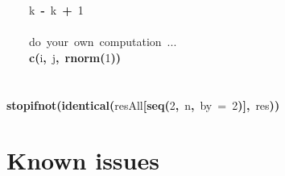 \documentclass[a4paper,12pt]{article}\usepackage{graphicx, color}
\makeatletter
\newcommand{\hlnumber}[1]{\textcolor[rgb]{0,0,0}{#1}}%
\newcommand{\hlfunctioncall}[1]{\textcolor[rgb]{0.501960784313725,0,0.329411764705882}{\textbf{#1}}}%
\newcommand{\hlkeyword}[1]{\textcolor[rgb]{0,0,0}{\textbf{#1}}}%
\newcommand{\hlargument}[1]{\textcolor[rgb]{0.690196078431373,0.250980392156863,0.0196078431372549}{#1}}%
\newcommand{\hlcomment}[1]{\textcolor[rgb]{0.180392156862745,0.6,0.341176470588235}{#1}}%
\newcommand{\hlassignement}[1]{\textcolor[rgb]{0,0,0}{\textbf{#1}}}%
\newcommand{\hlsymbol}[1]{\textcolor[rgb]{0,0,0}{#1}}%
\newcommand{\hlstd}[1]{\textcolor[rgb]{0,0,0}{#1}}%
\newenvironment{kframe}{%
 \def\FrameCommand##1{\hskip\@totalleftmargin \hskip-\fboxsep
 \colorbox{shadecolor}{##1}\hskip-\fboxsep
     \hskip-\linewidth \hskip-\@totalleftmargin \hskip\columnwidth}%
 \MakeFramed {\advance\hsize-\width
   \@totalleftmargin\z@ \linewidth\hsize
   \@setminipage}}%
 {\par\unskip\endMakeFramed}
\newenvironment{knitrout}{}{} %
\renewenvironment{knitrout}{\begin{footnotesize}}{\end{footnotesize}}
\makeatother
\begin{document}
\begin{knitrout}
\begin{kframe}
\begin{flushleft}
\hlstd{}{\ }{\ }{\ }{\ }\hlsymbol{k}{\ }\hlassignement{\usebox{\hlnormalsizeboxlessthan}-}{\ }\hlsymbol{k}{\ }\hlkeyword{+}{\ }\hlnumber{1}\hspace*{\fill}\\
\hlstd{}\hspace*{\fill}\\
\hlstd{}{\ }{\ }{\ }{\ }\hlcomment{\usebox{\hlnormalsizeboxhash}{\ }do{\ }your{\ }own{\ }computation{\ }...}\hspace*{\fill}\\
\hlstd{}{\ }{\ }{\ }{\ }\hlfunctioncall{c}\hlkeyword{(}\hlsymbol{i}\hlkeyword{,}{\ }\hlsymbol{j}\hlkeyword{,}{\ }\hlfunctioncall{rnorm}\hlkeyword{(}\hlnumber{1}\hlkeyword{)}\hlkeyword{)}\hspace*{\fill}\\
\hlstd{}\hlkeyword{\usebox{\hlnormalsizeboxclosebrace}}\hspace*{\fill}\\
\hlstd{}\hspace*{\fill}\\
\hlstd{}\hlfunctioncall{stopifnot}\hlkeyword{(}\hlfunctioncall{identical}\hlkeyword{(}\hlsymbol{resAll}\hlkeyword{[}\hlfunctioncall{seq}\hlkeyword{(}\hlnumber{2}\hlkeyword{,}{\ }\hlsymbol{n}\hlkeyword{,}{\ }\hlargument{by}{\ }\hlargument{=}{\ }\hlnumber{2}\hlkeyword{)}\hlkeyword{]}\hlkeyword{,}{\ }\hlsymbol{res}\hlkeyword{)}\hlkeyword{)}\mbox{}
\normalfont
\end{flushleft}
\end{kframe}
\end{knitrout}


\section{Known issues}
\label{sec:issues}
\end{document}
